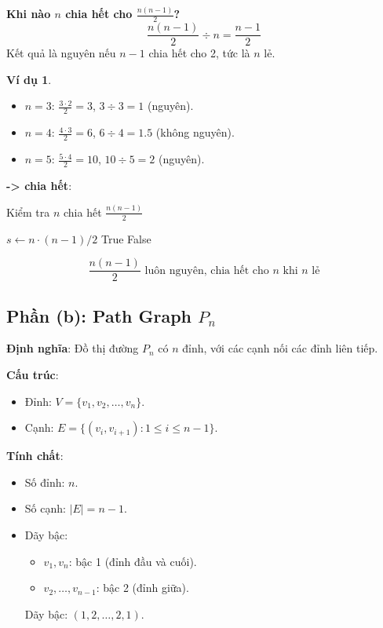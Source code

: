 \documentclass[a4paper,12pt]{article}
\theoremstyle{plain}
\theoremstyle{definition}
\newtheorem{example}{Ví dụ}
\begin{document}
\textbf{Khi nào \( n \) chia hết cho \( \frac{n(n-1)}{2} \)?}
\[
\frac{n(n-1)}{2} \div n = \frac{n-1}{2}
\]
Kết quả là nguyên nếu \( n-1 \) chia hết cho 2, tức là \( n \) lẻ.

\begin{example}
\begin{itemize}
    \item \( n=3 \): \( \frac{3 \cdot 2}{2} = 3 \), \( 3 \div 3 = 1 \) (nguyên).
    \item \( n=4 \): \( \frac{4 \cdot 3}{2} = 6 \), \( 6 \div 4 = 1.5 \) (không nguyên).
    \item \( n=5 \): \( \frac{5 \cdot 4}{2} = 10 \), \( 10 \div 5 = 2 \) (nguyên).
\end{itemize}
\end{example}

\textbf{-> chia hết}:
\begin{algorithm}
\caption{Kiểm tra \( n \) chia hết \( \frac{n(n-1)}{2} \)}
\begin{algorithmic}
    \State $s \gets n \cdot (n-1) / 2$
     \Return True
    \Else \Return False
    \EndIf
\EndFunction
\end{algorithmic}
\end{algorithm}

\[
\boxed{\frac{n(n-1)}{2} \text{ luôn nguyên, chia hết cho } n \text{ khi } n \text{ lẻ}}
\]

\subsection*{Phần (b): Path Graph \( P_n \)}

\textbf{Định nghĩa}: Đồ thị đường \( P_n \) có \( n \) đỉnh, với các cạnh nối các đỉnh liên tiếp.

\textbf{Cấu trúc}:
\begin{itemize}
    \item Đỉnh: \( V = \{v_1, v_2, \ldots, v_n\} \).
    \item Cạnh: \( E = \{(v_i, v_{i+1}) : 1 \leq i \leq n-1\} \).
\end{itemize}

\textbf{Tính chất}:
\begin{itemize}
    \item Số đỉnh: \( n \).
    \item Số cạnh: \( |E| = n-1 \).
    \item Dãy bậc:
    \begin{itemize}
        \item \( v_1, v_n \): bậc 1 (đỉnh đầu và cuối).
        \item \( v_2, \ldots, v_{n-1} \): bậc 2 (đỉnh giữa).
    \end{itemize}
    Dãy bậc: \( (1, 2, \ldots, 2, 1) \).
\end{itemize}
\end{document}

